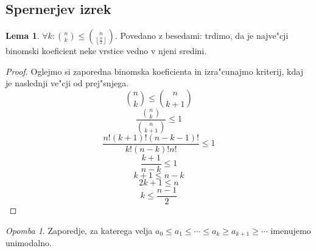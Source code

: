 \documentclass[a4paper,12pt]{article}
\theoremstyle{definition}
\newtheorem{lemma}[counter]{Lema}
\theoremstyle{remark}
\newtheorem*{rem}{Opomba}
\begin{document}
\subsection{Spernerjev izrek}
\begin{lemma}
	$\forall k: \binom{n}{k} \leqslant \binom{n}{\left\lfloor \frac{n}{2} \right\rfloor}$. 
	Povedano z besedami: trdimo, da je najve"cji binomski koeficient neke vrstice vedno v njeni sredini.
\end{lemma}
\begin{proof}
	Oglejmo si zaporedna binomska koeficienta in izra"cunajmo kriterij, kdaj je naslednji ve"cji od prej"snjega.
	\[ \binom{n}{k} \leqslant \binom{n}{k+1} \]
	\[ \frac{\binom{n}{k}}{\binom{n}{k+1}}\leqslant 1 \]
	\[ \frac{n!(k+1)!(n-k-1)!}{k!(n-k)!n!} \leqslant 1 \]
	\[ \frac{k+1}{n-k} \leq 1 \]
	\[ k+1 \leq n-k \]
	\[ 2k+1 \leq n \]
	\[ k \leqslant \frac{n-1}{2} \]
\end{proof}
\begin{rem}
	Zaporedje, za katerega velja $a_0 \leqslant a_1 \leqslant \cdots \leqslant a_k \geqslant a_{k+1} \geqslant \cdots$ imenujemo unimodalno.
\end{rem}
\end{document}
